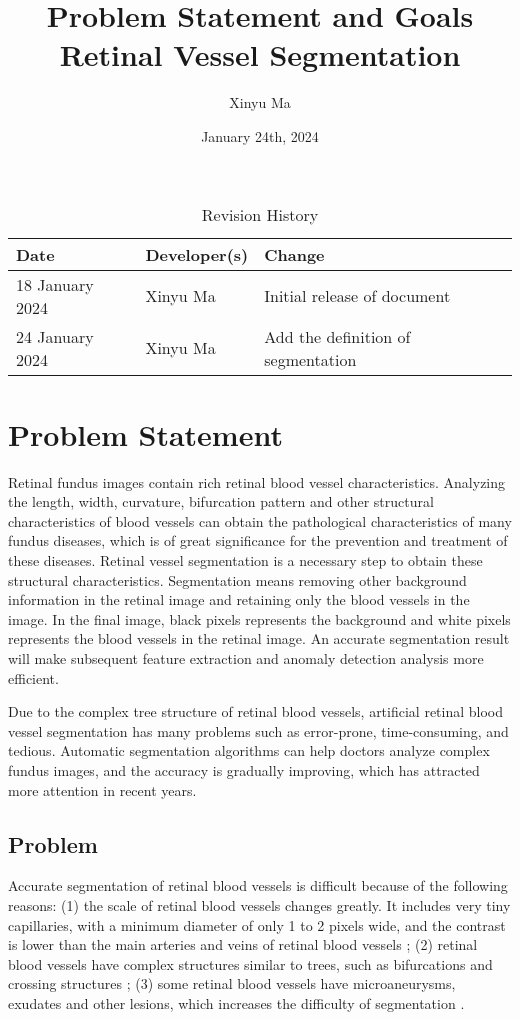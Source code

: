 \documentclass{article}
\title{Problem Statement and Goals\\Retinal Vessel Segmentation}
\author{Xinyu Ma}
\date{January 24th, 2024}
\begin{document}
\maketitle
\begin{table}[hp]
\caption{Revision History} \label{TblRevisionHistory}
\begin{tabularx}{\textwidth}{llX}
\toprule
\textbf{Date} & \textbf{Developer(s)} & \textbf{Change}\\
\midrule
18 January 2024 & \quad Xinyu Ma & Initial release of document\\
24 January 2024 & \quad Xinyu Ma & Add the definition of segmentation\\
\bottomrule
\end{tabularx}
\end{table}

\section{Problem Statement}

Retinal fundus images contain rich retinal blood vessel characteristics. Analyzing the length, width, curvature, bifurcation pattern and other structural characteristics of blood vessels can obtain the pathological characteristics of many fundus diseases, which is of great significance for the prevention and treatment of these diseases. Retinal vessel segmentation is a necessary step to obtain these structural characteristics. Segmentation means removing other background information in the retinal image and retaining only the blood vessels in the image. In the final image, black pixels represents the background and white pixels represents the blood vessels in the retinal image. An accurate segmentation result will make subsequent feature extraction and anomaly detection analysis more efficient.

Due to the complex tree structure of retinal blood vessels, artificial retinal blood vessel segmentation has many problems such as error-prone, time-consuming, and tedious. Automatic segmentation algorithms can help doctors analyze complex fundus images, and the accuracy is gradually improving, which has attracted more attention in recent years.

\subsection{Problem}

Accurate segmentation of retinal blood vessels is difficult because of the following reasons: (1) the scale of retinal blood vessels changes greatly. It includes very tiny capillaries, with a minimum diameter of only 1 to 2 pixels wide, and the contrast is lower than the main arteries and veins of retinal blood vessels \cite{wu2018multiscale}; (2) retinal blood vessels have complex structures similar to trees, such as bifurcations and crossing structures \cite{lian2019global}; (3) some retinal blood vessels have microaneurysms, exudates and other lesions, which increases the difficulty of segmentation \cite{lian2019global}.
\end{document}
